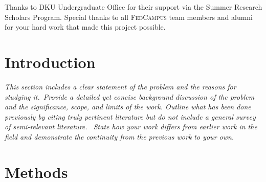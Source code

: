 \documentclass[11pt,a4paper,oneside]{report}
\newcommand{\instructions}[1]{{\color{orange}\itshape #1}}
\newcommand{\fedcampus}{\textsc{FedCampus}\xspace}
\begin{document}
Thanks to DKU Undergraduate Office for their support via
the Summer Research Scholars Program.
Special thanks to all \fedcampus team members and alumni for your hard work that
made this project possible.

\newpage


\setcounter{tocdepth}{1}
\listoffigures\newpage


\setcounter{tocdepth}{1}
\listoftables\newpage


\clearpage
{}


\chapter{Introduction}
\label{introduction}

\instructions{This section includes a clear statement of the problem and the
reasons for studying it.~Provide a detailed yet concise background
discussion of the problem and the significance, scope, and limits of the
work. Outline what has been done previously by citing truly pertinent
literature but do not include a general survey of semi-relevant
literature.~ State how your work differs from earlier work in the field
and demonstrate the continuity from the previous work to your own.}




\chapter{Methods}
\label{methods}
\end{document}
